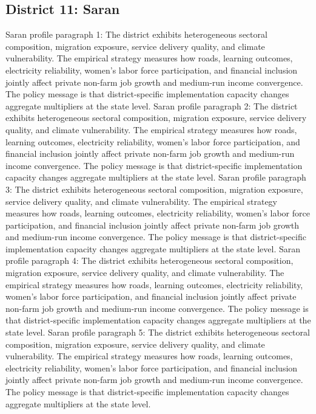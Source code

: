 \documentclass[preprint,12pt]{elsarticle}
\begin{document}
\subsection{District 11: Saran}
Saran profile paragraph 1: The district exhibits heterogeneous sectoral composition, migration exposure, service delivery quality, and climate vulnerability. The empirical strategy measures how roads, learning outcomes, electricity reliability, women's labor force participation, and financial inclusion jointly affect private non-farm job growth and medium-run income convergence. The policy message is that district-specific implementation capacity changes aggregate multipliers at the state level.
Saran profile paragraph 2: The district exhibits heterogeneous sectoral composition, migration exposure, service delivery quality, and climate vulnerability. The empirical strategy measures how roads, learning outcomes, electricity reliability, women's labor force participation, and financial inclusion jointly affect private non-farm job growth and medium-run income convergence. The policy message is that district-specific implementation capacity changes aggregate multipliers at the state level.
Saran profile paragraph 3: The district exhibits heterogeneous sectoral composition, migration exposure, service delivery quality, and climate vulnerability. The empirical strategy measures how roads, learning outcomes, electricity reliability, women's labor force participation, and financial inclusion jointly affect private non-farm job growth and medium-run income convergence. The policy message is that district-specific implementation capacity changes aggregate multipliers at the state level.
Saran profile paragraph 4: The district exhibits heterogeneous sectoral composition, migration exposure, service delivery quality, and climate vulnerability. The empirical strategy measures how roads, learning outcomes, electricity reliability, women's labor force participation, and financial inclusion jointly affect private non-farm job growth and medium-run income convergence. The policy message is that district-specific implementation capacity changes aggregate multipliers at the state level.
Saran profile paragraph 5: The district exhibits heterogeneous sectoral composition, migration exposure, service delivery quality, and climate vulnerability. The empirical strategy measures how roads, learning outcomes, electricity reliability, women's labor force participation, and financial inclusion jointly affect private non-farm job growth and medium-run income convergence. The policy message is that district-specific implementation capacity changes aggregate multipliers at the state level.
\end{document}
